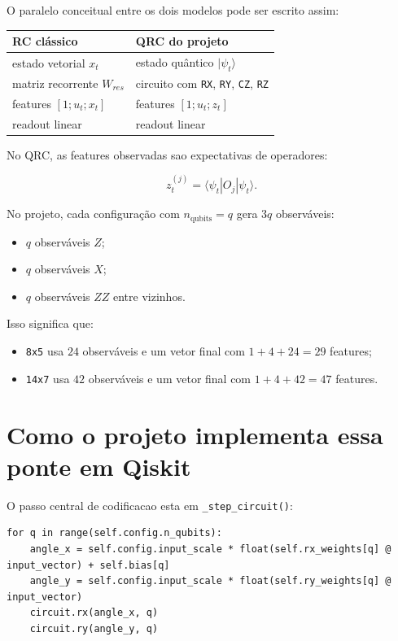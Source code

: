 \documentclass[12pt]{article}
\providecommand{\tightlist}{%
              \setlength{\itemsep}{0pt}\setlength{\parskip}{0pt}}
\begin{document}
O paralelo conceitual entre os dois modelos pode ser escrito assim:

\begin{longtable}[]{@{}ll@{}}
\toprule\noalign{}
RC clássico & QRC do projeto \\
\midrule\noalign{}
\endhead
\bottomrule\noalign{}
\endlastfoot
estado vetorial \(x_t\) & estado quântico \(\lvert\psi_t\rangle\) \\
matriz recorrente \(W_{res}\) & circuito com \texttt{RX}, \texttt{RY}, \texttt{CZ}, \texttt{RZ} \\
features \([1; u_t; x_t]\) & features \([1; u_t; z_t]\) \\
readout linear & readout linear \\
\end{longtable}

No QRC, as features observadas sao expectativas de operadores:

\[
z_t^{(j)} = \langle \psi_t | O_j | \psi_t \rangle.
\]

No projeto, cada configuração com \(n_{\text{qubits}} = q\) gera \(3q\) observáveis:

\begin{itemize}
\tightlist
\item
  \(q\) observáveis \(Z\);
\item
  \(q\) observáveis \(X\);
\item
  \(q\) observáveis \(ZZ\) entre vizinhos.
\end{itemize}

Isso significa que:

\begin{itemize}
\tightlist
\item
  \texttt{8x5} usa \(24\) observáveis e um vetor final com \(1 + 4 + 24 = 29\) features;
\item
  \texttt{14x7} usa \(42\) observáveis e um vetor final com \(1 + 4 + 42 = 47\) features.
\end{itemize}

\section{Como o projeto implementa essa ponte em Qiskit}\label{5-como-o-projeto-implementa-essa-ponte-em-qiskit}

O passo central de codificacao esta em \texttt{\_step\_circuit()}:

\begin{verbatim}
for q in range(self.config.n_qubits):
    angle_x = self.config.input_scale * float(self.rx_weights[q] @ input_vector) + self.bias[q]
    angle_y = self.config.input_scale * float(self.ry_weights[q] @ input_vector)
    circuit.rx(angle_x, q)
    circuit.ry(angle_y, q)
\end{verbatim}
\end{document}
